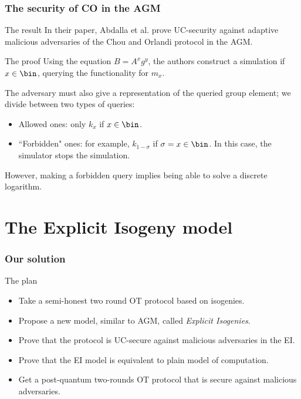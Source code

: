 \documentclass{beamer}
\begin{document}
    \begin{frame}
        \frametitle{The security of CO in the AGM}
        
        \begin{block}{The result}
            In their paper, Abdalla et al. prove UC-security against adaptive malicious adversaries of the Chou and Orlandi protocol in the AGM.
        \end{block}
    
        \begin{block}{The proof}
            Using the equation $B=A^xg^y$, the authors construct a simulation if $x\in\bin$, querying the functionality for $m_x$.
            
            The adversary must also give a representation of the queried group element; we divide between two types of queries:
            \begin{itemize}
                \item Allowed ones: only $k_x$ if $x\in\bin$.
                \item ``Forbidden" ones: for example, $k_{1-\sigma}$ if $\sigma=x\in\bin$. In this case, the simulator stops the simulation.
            \end{itemize}
            However, making a forbidden query implies being able to solve a discrete logarithm.
        \end{block}
    \end{frame}

    
    \section{The Explicit Isogeny model}
        
    \begin{frame}
        \frametitle{Our solution}
        
        \begin{block}{The plan}
            \begin{itemize}
                \item Take a semi-honest two round OT protocol based on isogenies.
                \item Propose a new model, similar to AGM, called \emph{Explicit Isogenies}.
                \item Prove that the protocol is UC-secure against malicious adversaries in the EI.
                \item {\color{gray}Prove that the EI model is equivalent to plain model of computation.}
                \item Get a post-quantum two-rounds OT protocol that is secure against malicious adversaries.
            \end{itemize}
        \end{block}
    \end{frame}
\end{document}
